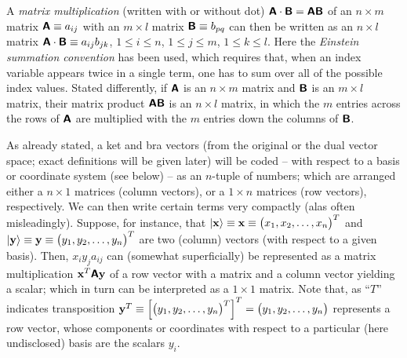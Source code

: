 A {\em matrix multiplication}
 (written with or without dot)
$\textsf{\textbf{A}} \cdot \textsf{\textbf{B}} = \textsf{\textbf{A}}  \textsf{\textbf{B}}$
of an $n \times m$ matrix $\textsf{\textbf{A}}\equiv a_{ij}$
with an $m \times l$ matrix $\textsf{\textbf{B}}\equiv b_{pq}$
can then be written as an $n \times l$ matrix
$\textsf{\textbf{A}} \cdot \textsf{\textbf{B}} \equiv a_{ij}b_{jk}$,
$1\le i\le n$,
$1\le j\le m$,
$1\le k\le l$.
Here the {\em Einstein summation convention}
 has been used,
which requires that, when an index variable appears twice in a single term, one has to
sum over all of the possible index values.
Stated differently, if $\textsf{\textbf{A}}$ is an $n \times m$ matrix and $\textsf{\textbf{B}}$ is an $m \times l$ matrix,
their matrix product $\textsf{\textbf{A}}\textsf{\textbf{B}}$ is an $n \times l$ matrix, in which the $m$
entries across the rows of $\textsf{\textbf{A}}$ are multiplied with the $m$ entries down the columns of $\textsf{\textbf{B}}$.

As already stated, a ket and bra vectors (from the original or the dual vector space; exact definitions will be given later)
will be coded -- with respect to a basis or coordinate system (see below) -- as an $n$-tuple of numbers;
which are arranged either a $n \times 1$ matrices (column vectors),
or a $1 \times n$ matrices (row vectors), respectively.
We can then write certain terms very compactly (alas often misleadingly).
Suppose, for instance, that
$\vert {\bf x} \rangle \equiv {\bf x}\equiv \begin{pmatrix}x_1, x_2,\ldots ,x_n\end{pmatrix}^T$
and
$\vert {\bf y} \rangle \equiv {\bf y}\equiv \begin{pmatrix}y_1, y_2,\ldots ,y_n\end{pmatrix}^T$
are two (column) vectors (with respect to a given basis).
Then, $x_iy_j a_{ij}$ can (somewhat superficially) be represented as a matrix multiplication ${\bf x}^T \textsf{\textbf{A}} {\bf y}$ of
a row vector with a matrix and a column vector  yielding a scalar; which in turn can be interpreted as a $1 \times 1$ matrix.
Note that, as ``$T$'' indicates transposition
${\bf y}^T\equiv \left[ \begin{pmatrix}
y_1,
y_2,
\ldots ,
y_n
\end{pmatrix}^T\right]^T
=
\begin{pmatrix}
y_1,
y_2,
\ldots ,
y_n
\end{pmatrix}
$
represents a row vector, whose components or coordinates with respect to a particular (here undisclosed) basis are the scalars $y_i$.


